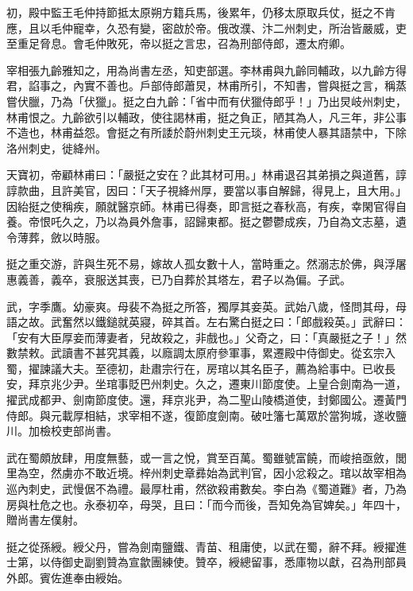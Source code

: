 \begin{pinyinscope}
 初，殿中監王毛仲持節抵太原朔方籍兵馬，後累年，仍移太原取兵仗，挺之不肯應，且以毛仲寵幸，久恐有變，密啟於帝。俄改濮、汴二州刺史，所治皆嚴威，吏至重足脅息。會毛仲敗死，帝以挺之言忠，召為刑部侍郎，遷太府卿。



 宰相張九齡雅知之，用為尚書左丞，知吏部選。李林甫與九齡同輔政，以九齡方得君，諂事之，內實不善也。戶部侍郎蕭炅，林甫所引，不知書，嘗與挺之言，稱蒸嘗伏臘，乃為「伏獵」。挺之白九齡：「省中而有伏獵侍郎乎！」乃出炅岐州刺史，林甫恨之。九齡欲引以輔政，使往謁林甫，挺之負正，陋其為人，凡三年，非公事不造也，林甫益怨。會挺之有所諉於蔚州刺史王元琰，林甫使人暴其語禁中，下除洛州刺史，徙絳州。



 天寶初，帝顧林甫曰：「嚴挺之安在？此其材可用。」林甫退召其弟損之與道舊，諄諄款曲，且許美官，因曰：「天子視絳州厚，要當以事自解歸，得見上，且大用。」因紿挺之使稱疾，願就醫京師。林甫已得奏，即言挺之春秋高，有疾，幸閑官得自養。帝恨吒久之，乃以為員外詹事，詔歸東都。挺之鬱鬱成疾，乃自為文志墓，遺令薄葬，斂以時服。



 挺之重交游，許與生死不易，嫁故人孤女數十人，當時重之。然溺志於佛，與浮屠惠義善，義卒，衰服送其喪，已乃自葬於其塔左，君子以為偏。子武。



 武，字季鷹。幼豪爽。母裴不為挺之所答，獨厚其妾英。武始八歲，怪問其母，母語之故。武奮然以鐵鎚就英寢，碎其首。左右驚白挺之曰：「郎戲殺英。」武辭曰：「安有大臣厚妾而薄妻者，兒故殺之，非戲也。」父奇之，曰：「真嚴挺之子！」然數禁敕。武讀書不甚究其義，以廕調太原府參軍事，累遷殿中侍御史。從玄宗入蜀，擢諫議大夫。至德初，赴肅宗行在，房琯以其名臣子，薦為給事中。已收長安，拜京兆少尹。坐琯事貶巴州刺史。久之，遷東川節度使。上皇合劍南為一道，擢武成都尹、劍南節度使。還，拜京兆尹，為二聖山陵橋道使，封鄭國公。遷黃門侍郎。與元載厚相結，求宰相不遂，復節度劍南。破吐籓七萬眾於當狗城，遂收鹽川。加檢校吏部尚書。



 武在蜀頗放肆，用度無藝，或一言之悅，賞至百萬。蜀雖號富饒，而峻掊亟斂，閭里為空，然虜亦不敢近境。梓州刺史章彞始為武判官，因小忿殺之。琯以故宰相為巡內刺史，武慢倨不為禮。最厚杜甫，然欲殺甫數矣。李白為《蜀道難》者，乃為房與杜危之也。永泰初卒，母哭，且曰：「而今而後，吾知免為官婢矣。」年四十，贈尚書左僕射。



 挺之從孫綬。綬父丹，嘗為劍南鹽鐵、青苗、租庸使，以武在蜀，辭不拜。綬擢進士第，以侍御史副劉贊為宣歙團練使。贊卒，綬總留事，悉庫物以獻，召為刑部員外郎。賓佐進奉由綬始。




\end{pinyinscope}
